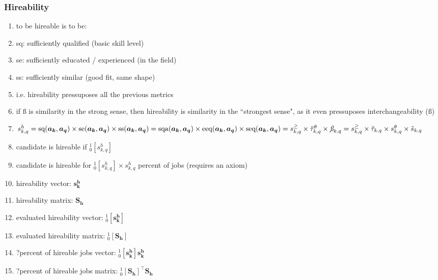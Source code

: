 \documentclass{elsarticle} %
\begin{document}
\subsubsection{Hireability}
\begin{enumerate}
    \item to be hireable is to be:
    \item sq: sufficiently qualified (basic skill level)
    \item se: sufficiently educated / experienced (in the field)
    \item ss: sufficiently similar (good fit, same shape)
    \item i.e. hireability pressuposes all the previous metrics
    \item if $\textit{\ss}$ is similarity in the strong sense, then hireability is similarity
          in the ``strongest sense", as it even pressuposes interchangeability ($\textit{\ss}$)
    \item $
              s_{k,q}^{h} =
              \text{sq}(\boldsymbol{a_k},\boldsymbol{a_q}) \times
              \text{se}(\boldsymbol{a_k},\boldsymbol{a_q}) \times
              \text{ss}(\boldsymbol{a_k},\boldsymbol{a_q}) = \\
              \text{sqa}(\boldsymbol{a_k},\boldsymbol{a_q}) \times
              \text{eeq}(\boldsymbol{a_k},\boldsymbol{a_q}) \times
              \text{seq}(\boldsymbol{a_k},\boldsymbol{a_q}) = \\
              s_{k,q}^{\geq} \times
              \ddot{\tau}_{k,q}^{\theta} \times
              \textit{\ss}_{k,q} = \\
              s_{k,q}^{\geq} \times
              \ddot{\tau}_{k,q} \times
              s_{k,q}^{\theta} \times
              \ddot{s}_{k,q}
          $
    \item candidate is hireable if $_{0}^{1}[s_{k,q}^{h}]$
    \item candidate is hireable for $_{0}^{1}[s_{k,q}^{h}] \times s_{k,q}^{h}$ percent of jobs (requires an axiom)
    \item hireability vector: $\boldsymbol{s_{k}^{h}}$
    \item hireability matrix: $\boldsymbol{\textbf{S}_{h}}$
    \item evaluated hireability vector: $_{0}^{1}[\boldsymbol{s_{k}^{h}}]$
    \item evaluated hireability matrix: $_{0}^{1}[\boldsymbol{\textbf{S}_{h}}]$
    \item ?percent of hireable jobs vector: $_{0}^{1}[\boldsymbol{s_{k}^{h}}]\boldsymbol{s_{k}^{h}}$
    \item ?percent of hireable jobs matrix: $_{0}^{1}[\boldsymbol{\textbf{S}_{h}}]^{\top}\boldsymbol{\textbf{S}_{h}}$
\end{enumerate}
\end{document}
